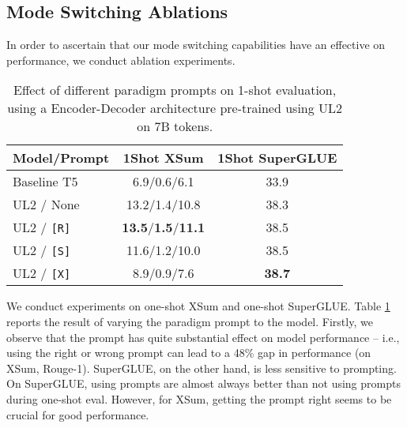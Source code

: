 \documentclass[10pt]{article}
\begin{document}
\subsection{Mode Switching Ablations}
In order to ascertain that our mode switching capabilities have an effective on performance, we conduct ablation experiments.
\begin{table}[t]
    \centering
     \caption{Effect of different paradigm prompts on 1-shot evaluation, using a Encoder-Decoder architecture pre-trained using UL2  on 7B tokens.}
    \label{tab:prompt_effect}
    \begin{tabular}{lcc}
    \toprule
       Model/Prompt  & 1Shot XSum & 1Shot SuperGLUE \\
         \midrule
         Baseline T5 &  6.9/0.6/6.1 & 33.9 \\
       UL2 / None & 13.2/1.4/10.8 & 38.3 \\
       UL2 / \texttt{[R]}  & \textbf{13.5}/\textbf{1.5}/\textbf{11.1} & 38.5 \\
       UL2 / \texttt{[S]} &11.6/1.2/10.0& 38.5\\ 
       UL2 / \texttt{[X]} & 8.9/0.9/7.6 & \textbf{38.7}\\
         \bottomrule
    \end{tabular}
\end{table}
We conduct experiments on one-shot XSum and one-shot SuperGLUE. Table \ref{tab:prompt_effect} reports the result of varying the paradigm prompt to the model. Firstly, we observe that the prompt has quite substantial effect on model performance -- i.e., using the right or wrong prompt can lead to a 48\% gap in performance (on XSum, Rouge-1). SuperGLUE, on the other hand, is less sensitive to prompting. On SuperGLUE, using prompts are almost always better than not using prompts during one-shot eval. However, for XSum, getting the prompt right seems to be crucial for good performance.
\end{document}
